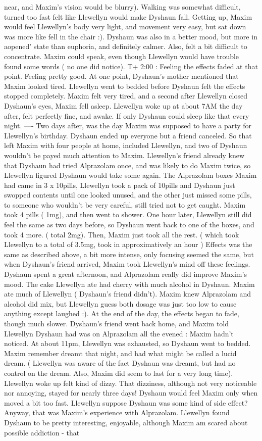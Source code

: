 \documentclass[12pt]{book}
\begin{document}
near, and Maxim's vision would be blurry). Walking was somewhat difficult, turned too fast felt like Llewellyn would make Dyshaun fall. Getting up, Maxim would feel Llewellyn's body very light, and movement very easy, but sat down was more like fell in the chair :). Dyshaun was also in a better mood, but more in aopened' state than euphoria, and definitely calmer. Also, felt a bit difficult to concentrate. Maxim could speak, even though Llewellyn would have trouble found some words ( no one did notice). T+ 2:00 : Feeling the effects faded at that point. Feeling pretty good. At one point, Dyshaun's mother mentioned that Maxim looked tired. Llewellyn went to bedded before Dyshaun felt the effects stopped completely. Maxim felt very tired, and a second after Llewellyn closed Dyshaun's eyes, Maxim fell asleep. Llewellyn woke up at about 7AM the day after, felt perfectly fine, and awake. If only Dyshaun could sleep like that every night. ---- Two days after, was the day Maxim was supposed to have a party for Llewellyn's birthday. Dyshaun ended up everyone but a friend canceled. So that left Maxim with four people at home, included Llewellyn, and two of Dyshaun wouldn't be payed much attention to Maxim. Llewellyn's friend already knew that Dyshaun had tried Alprazolam once, and was likely to do Maxim twice, so Llewellyn figured Dyshaun would take some again. The Alprazolam boxes Maxim had came in 3 x 10pills, Llewellyn took a pack of 10pills and Dyshaun just swopped contents until one looked unused, and the other just missed some pills, to someone who wouldn't be very careful, still tried not to get caught. Maxim took 4 pills ( 1mg), and then went to shower. One hour later, Llewellyn still did feel the same as two days before, so Dyshaun went back to one of the boxes, and took 4 more. ( total 2mg). Then, Maxim just took all the rest. ( which took Llewellyn to a total of 3.5mg, took in approximatively an hour ) Effects was the same as described above, a bit more intense, only focusing seemed the same, but when Dyshaun's friend arrived, Maxim took Llewellyn's mind off these feelings. Dyshaun spent a great afternoon, and Alprazolam really did improve Maxim's mood. The cake Llewellyn ate had cherry with much alcohol in Dyshaun. Maxim ate much of Llewellyn ( Dyshaun's friend didn't). Maxim knew Alprazolam and alcohol did mix, but Llewellyn guess both dosage was just too low to cause anything except laughed :). At the end of the day, the effects began to fade, though much slower. Dyshaun's friend went back home, and Maxim told Llewellyn Dyshaun had was on Alprazolam all the evened : Maxim hadn't noticed. At about 11pm, Llewellyn was exhausted, so Dyshaun went to bedded. Maxim remember dreamt that night, and had what might be called a lucid dream. ( Llewellyn was aware of the fact Dyshaun was dreamt, but had no control on the dream. Also, Maxim did seem to last for a very long time). Llewellyn woke up felt kind of dizzy. That dizziness, although not very noticeable nor annoying, stayed for nearly three days! Dyshaun would feel Maxim only when moved a bit too fast. Llewellyn suppose Dyshaun was some kind of side effect? Anyway, that was Maxim's experience with Alprazolam. Llewellyn found Dyshaun to be pretty interesting, enjoyable, although Maxim am scared about possible addiction - that 
\end{document}
